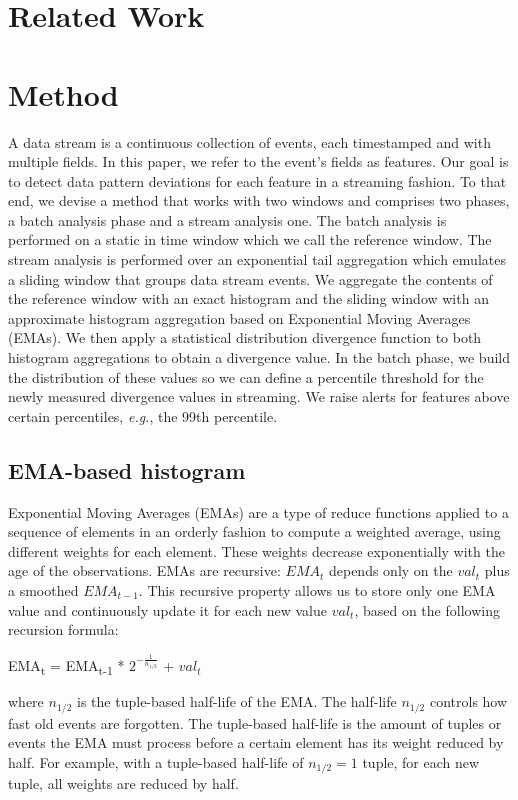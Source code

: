 \documentclass[sigconf]{acmart}
\begin{document}
\section{Related Work}
\label{sec:RelatedWork}


\section{Method}
\label{sec:Method}
A data stream is a continuous collection of events, each timestamped and with multiple fields. In this paper, we refer to the event's fields as features. Our goal is to detect data pattern deviations for each feature in a streaming fashion. To that end, we devise a method that works with two windows and comprises two phases, a batch analysis phase and a stream analysis one. The batch analysis is performed on a static in time window which we call the reference window. The stream analysis is performed over an exponential tail aggregation which emulates a sliding window that groups data stream events. We aggregate the contents of the reference window with an exact histogram and the sliding window with an approximate histogram aggregation based on Exponential Moving Averages (EMAs). We then apply a statistical distribution divergence function to both histogram aggregations to obtain a divergence value. In the batch phase, we build the distribution of these values so we can define a percentile threshold for the newly measured divergence values in streaming. We raise alerts for features above certain percentiles, \textit{e.g.}, the 99th percentile.

\subsection{EMA-based histogram} \label{sec:ema-hist}
Exponential Moving Averages (EMAs) \cite{EMA-Everett2011, EMA-Hunter, EMA-MarcusB} are a type of reduce functions applied to a sequence of elements in an orderly fashion to compute a weighted average, using different weights for each element. These weights decrease exponentially with the age of the observations. EMAs are recursive: $EMA_t$ depends only on the $val_t$ plus a smoothed $EMA_{t-1}$. This recursive property allows us to store only one EMA value and continuously update it for each new value $val_t$, based on the following recursion formula:
\begin{definition}
EMA\textsubscript{t} = EMA\textsubscript{t-1} * $2^{-\frac{1}{n_{1/2}}}$ + $val_t$
\label{def:tuple-ema}
\end{definition} where $n_{1/2}$ is the tuple-based half-life of the EMA. 
The half-life $n_{1/2}$ controls how fast old events are forgotten. The tuple-based half-life is the amount of tuples or events the EMA must process before a certain element has its weight reduced by half. For example, with a tuple-based half-life of $n_{1/2}=1$ tuple, for each new tuple, all weights are reduced by half. 
\end{document}
